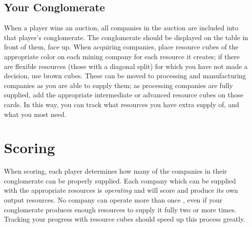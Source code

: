 \documentclass[]{article}
\begin{document}
\subsection*{Your Conglomerate}

When a player wins an auction, all companies in the auction are included into that player's conglomerate. The conglomerate should be displayed on the table in front of them, face up. When acquiring companies, place resource cubes of the appropriate color on each mining company for each resource it creates; if there are flexible resources (those with a diagonal split) for which you have not made a decision, use brown cubes. These can be moved to processing and manufacturing companies as you are able to supply them; as processing companies are fully supplied, add the appropriate intermediate or advanced resource cubes on those cards. In this way, you can track what resources you have extra supply of, and what you most need.

\section*{Scoring}

When scoring, each player determines how many of the companies in their conglomerate can be properly supplied. Each company which can be supplied with the appropriate resources is \emph{operating} %
and will score and produce its own output resources. No company can operate more than once%
, even if your conglomerate produces enough resources to supply it fully two or more times. %
Tracking your progress with resource cubes should speed up this process greatly.

\end{document}
